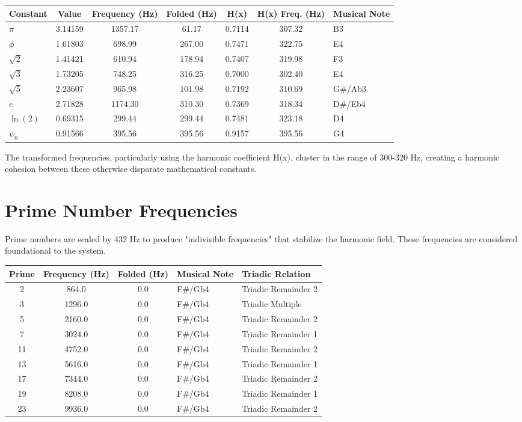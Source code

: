 \begin{longtable}{|l|c|c|c|c|c|l|}
\hline
\textbf{Constant} & \textbf{Value} & \textbf{Frequency (Hz)} & \textbf{Folded (Hz)} & \textbf{H(x)} & \textbf{H(x) Freq. (Hz)} & \textbf{Musical Note} \\
\hline
$\pi$ & 3.14159 & 1357.17 & 61.17 & 0.7114 & 307.32 & B3 \\
\hline
$\phi$ & 1.61803 & 698.99 & 267.00 & 0.7471 & 322.75 & E4 \\
\hline
$\sqrt{2}$ & 1.41421 & 610.94 & 178.94 & 0.7407 & 319.98 & F3 \\
\hline
$\sqrt{3}$ & 1.73205 & 748.25 & 316.25 & 0.7000 & 302.40 & E4 \\
\hline
$\sqrt{5}$ & 2.23607 & 965.98 & 101.98 & 0.7192 & 310.69 & G\#/Ab3 \\
\hline
$e$ & 2.71828 & 1174.30 & 310.30 & 0.7369 & 318.34 & D\#/Eb4 \\
\hline
$\ln(2)$ & 0.69315 & 299.44 & 299.44 & 0.7481 & 323.18 & D4 \\
\hline
$\psi_0$ & 0.91566 & 395.56 & 395.56 & 0.9157 & 395.56 & G4 \\
\hline
\end{longtable}

The transformed frequencies, particularly using the harmonic coefficient H(x), cluster in the range of 300-320 Hz, creating a harmonic cohesion between these otherwise disparate mathematical constants.

\section{Prime Number Frequencies}

Prime numbers are scaled by 432 Hz to produce "indivisible frequencies" that stabilize the harmonic field. These frequencies are considered foundational to the system.

\begin{longtable}{|c|c|c|l|l|}
\hline
\textbf{Prime} & \textbf{Frequency (Hz)} & \textbf{Folded (Hz)} & \textbf{Musical Note} & \textbf{Triadic Relation} \\
\hline
2 & 864.0 & 0.0 & F\#/Gb4 & Triadic Remainder 2 \\
\hline
3 & 1296.0 & 0.0 & F\#/Gb4 & Triadic Multiple \\
\hline
5 & 2160.0 & 0.0 & F\#/Gb4 & Triadic Remainder 2 \\
\hline
7 & 3024.0 & 0.0 & F\#/Gb4 & Triadic Remainder 1 \\
\hline
11 & 4752.0 & 0.0 & F\#/Gb4 & Triadic Remainder 2 \\
\hline
13 & 5616.0 & 0.0 & F\#/Gb4 & Triadic Remainder 1 \\
\hline
17 & 7344.0 & 0.0 & F\#/Gb4 & Triadic Remainder 2 \\
\hline
19 & 8208.0 & 0.0 & F\#/Gb4 & Triadic Remainder 1 \\
\hline
23 & 9936.0 & 0.0 & F\#/Gb4 & Triadic Remainder 2 \\
\hline
\end{longtable}

